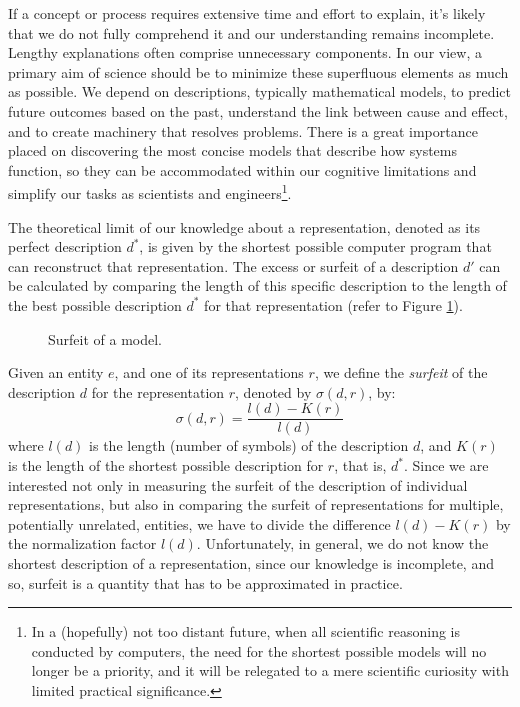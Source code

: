 If a concept or process requires extensive time and effort to explain, it's likely that we do not fully comprehend it and our understanding remains incomplete. Lengthy explanations often comprise unnecessary components. In our view, a primary aim of science should be to minimize these superfluous elements as much as possible. We depend on descriptions, typically mathematical models, to predict future outcomes based on the past, understand the link between cause and effect, and to create machinery that resolves problems. There is a great importance placed on discovering the most concise models that describe how systems function, so they can be accommodated within our cognitive limitations and simplify our tasks as scientists and engineers\footnote{In a (hopefully) not too distant future, when all scientific reasoning is conducted by computers, the need for the shortest possible models will no longer be a priority, and it will be relegated to a mere scientific curiosity with limited practical significance.}.

The theoretical limit of our knowledge about a representation, denoted as its perfect description $d^\ast$, is given by the shortest possible computer program that can reconstruct that representation. The excess or surfeit of a description $d'$ can be calculated by comparing the length of this specific description to the length of the best possible description $d^\ast$ for that representation (refer to Figure \ref{fig:intro-surfeit}).

\begin{figure}[t]
\centering
{}
\caption{\label{fig:intro-surfeit}Surfeit of a model.}
\end{figure}

Given an entity $e$, and one of its representations $r$, we define the \emph{surfeit} of the description $d$ for the representation $r$, denoted by $\sigma(d, r)$, by:
\[
\sigma\left(d, r\right) = \frac{l \left(d\right) - K(r)}{l \left(d\right)}
\]
where $l \left(d\right)$ is the length (number of symbols) of the description $d$, and $K(r)$ is the length of the shortest possible description for $r$, that is, $d^\ast$. Since we are interested not only in measuring the surfeit of the description of individual representations, but also in comparing the surfeit of representations for multiple, potentially unrelated, entities, we have to divide the difference $l \left(d\right) - K(r)$ by the normalization factor $l \left(d\right)$. Unfortunately, in general, we do not know the shortest description of a representation, since our knowledge is incomplete, and so, surfeit is a quantity that has to be approximated in practice.

